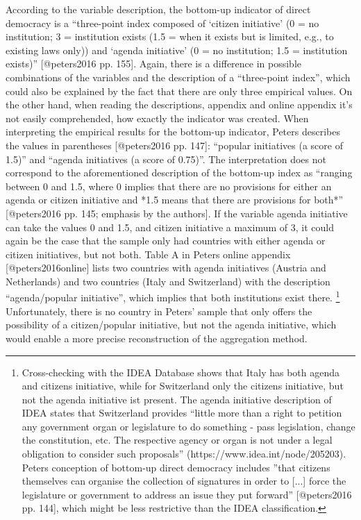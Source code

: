 \documentclass{systats}
\begin{document}
According to the variable description, the bottom-up indicator of direct democracy is a “three-point index composed of ‘citizen initiative’ (0 = no institution; 3 = institution exists (1.5 = when it exists but is limited, e.g., to existing laws only)) and ‘agenda initiative’ (0 = no institution; 1.5 = institution exists)” [@peters2016 pp. 155]. Again, there is a difference in possible combinations of the variables and the description of a “three-point index”, which could also be explained by the fact that there are only three empirical values. On the other hand, when reading the descriptions, appendix and online appendix it’s not easily comprehended, how exactly the indicator was created. When interpreting the empirical results for the bottom-up indicator, Peters describes the values in parentheses [@peters2016 pp. 147]: “popular initiatives (a score of 1.5)” and “agenda initiatives (a score of 0.75)”. The interpretation does not correspond to the aforementioned description of the bottom-up index as “ranging between 0 and 1.5, where 0 implies that there are no provisions for either an agenda or citizen initiative and *1.5 means that there are provisions for both*” [@peters2016 pp. 145; emphasis by the authors]. If the variable agenda initiative can take the values 0 and 1.5, and citizen initiative a maximum of 3, it could again be the case that the sample only had countries with either agenda or citizen initiatives, but not both. Table A in Peters online appendix [@peters2016online] lists two countries with agenda initiatives (Austria and Netherlands) and two countries (Italy and Switzerland) with the description “agenda/popular initiative”, which implies that both institutions exist there. \footnote{Cross-checking with the IDEA Database shows that Italy has both agenda and citizens initiative, while for Switzerland only the citizens initiative, but not the agenda initiative ist present. The agenda initiative description of IDEA states that Switzerland provides “little more than a right to petition any government organ or legislature to do something - pass legislation, change the constitution, etc. The respective agency or organ is not under a legal obligation to consider such proposals” (https://www.idea.int/node/205203). Peters conception of bottom-up direct democracy  includes ”that citizens themselves can organise the collection of signatures in order to [...] force the legislature or government to address an issue they put forward” [@peters2016 pp. 144], which might be less restrictive than the IDEA classification.} Unfortunately, there is no country in Peters’ sample that only offers the possibility of a citizen/popular initiative, but not the agenda initiative, which would enable a more precise reconstruction of the aggregation method. 
\end{document}
